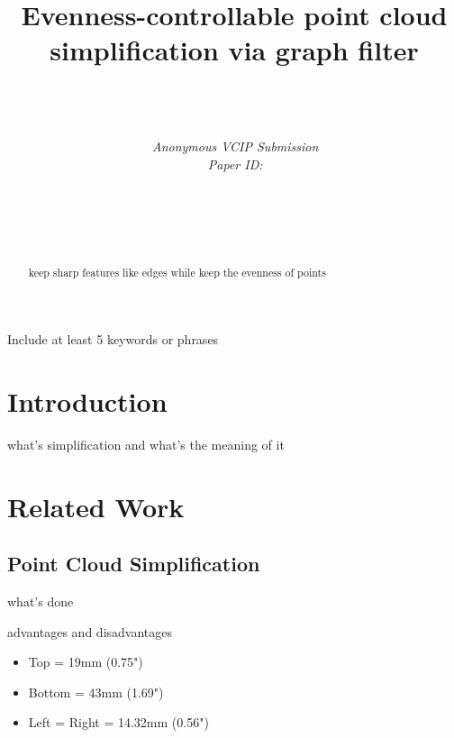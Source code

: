 \documentclass[10pt,conference,a4paper]{IEEEtran}
\title{Evenness-controllable point cloud simplification via graph filter}
\author{%
{}
\vspace{1.6mm}\\
\fontsize{10}{10}\selectfont\itshape
\,\\ 
\\
\fontsize{9}{9}\selectfont\ttfamily\upshape
%
\,Anonymous VCIP Submission\\
\,Paper ID:

\vspace{1.2mm}\\
\fontsize{10}{10}\selectfont\rmfamily\itshape
\,\\ 
\\

\fontsize{9}{9}\selectfont\ttfamily\upshape
\,
}
\begin{document}
\maketitle

\begin{figure}[b]
\parbox{\hsize}{\em

}\end{figure}


\begin{abstract}
keep sharp features like edges while keep the evenness of points
\\[1\baselineskip]
\end{abstract}


\begin{keywords}
Include at least 5 keywords or phrases
\end{keywords}
%


\section{Introduction}
%
what's simplification and what's the meaning of it

\section{Related Work}

\subsection{Point Cloud Simplification}

what's done

advantages and disadvantages

\begin{itemize}
\item	Top = 19mm (0.75")
\item	Bottom = 43mm (1.69")
\item	Left = Right = 14.32mm (0.56")
\end{itemize}
\end{document}
